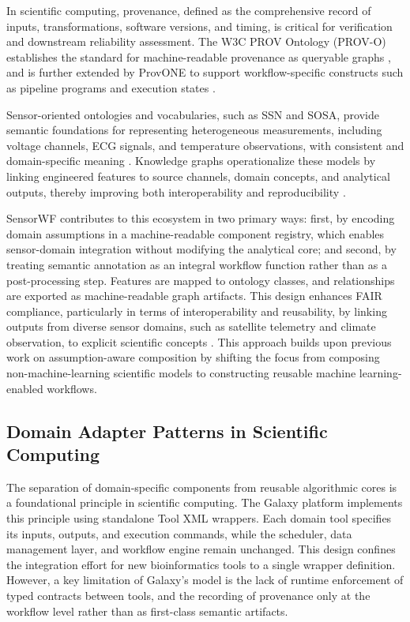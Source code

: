 \documentclass[conference]{IEEEtran}
\begin{document}
In scientific computing, provenance, defined as the comprehensive record of inputs, transformations, software versions, and timing, is critical for verification and downstream reliability assessment. The W3C PROV Ontology (PROV-O) establishes the standard for machine-readable provenance as queryable graphs \cite{provo2013}, and is further extended by ProvONE to support workflow-specific constructs such as pipeline programs and execution states \cite{missier2013provone}.

Sensor-oriented ontologies and vocabularies, such as SSN and SOSA, provide semantic foundations for representing heterogeneous measurements, including voltage channels, ECG signals, and temperature observations, with consistent and domain-specific meaning \cite{haller2019ssn,compton2012ssn}. Knowledge graphs operationalize these models by linking engineered features to source channels, domain concepts, and analytical outputs, thereby improving both interoperability and reproducibility \cite{provo2013,missier2013provone}.

SensorWF contributes to this ecosystem in two primary ways: first, by encoding domain assumptions in a machine-readable component registry, which enables sensor-domain integration without modifying the analytical core; and second, by treating semantic annotation as an integral workflow function rather than as a post-processing step. Features are mapped to ontology classes, and relationships are exported as machine-readable graph artifacts. This design enhances FAIR compliance, particularly in terms of interoperability and reusability, by linking outputs from diverse sensor domains, such as satellite telemetry and climate observation, to explicit scientific concepts \cite{wilkinson2016fair,gustafsson2025workflowhub}. This approach builds upon previous work on assumption-aware composition \cite{vargas-acosta_automating_2022,vargas_acosta_automated_2024,vargas-acosta_towards_2025} by shifting the focus from composing non-machine-learning scientific models to constructing reusable machine learning-enabled workflows.

\subsection{Domain Adapter Patterns in Scientific Computing}

The separation of domain-specific components from reusable algorithmic cores is a foundational principle in scientific computing. The Galaxy platform \cite{afgan2018galaxy} implements this principle using standalone Tool XML wrappers. Each domain tool specifies its inputs, outputs, and execution commands, while the scheduler, data management layer, and workflow engine remain unchanged. This design confines the integration effort for new bioinformatics tools to a single wrapper definition. However, a key limitation of Galaxy's model is the lack of runtime enforcement of typed contracts between tools, and the recording of provenance only at the workflow level rather than as first-class semantic artifacts.
\end{document}
